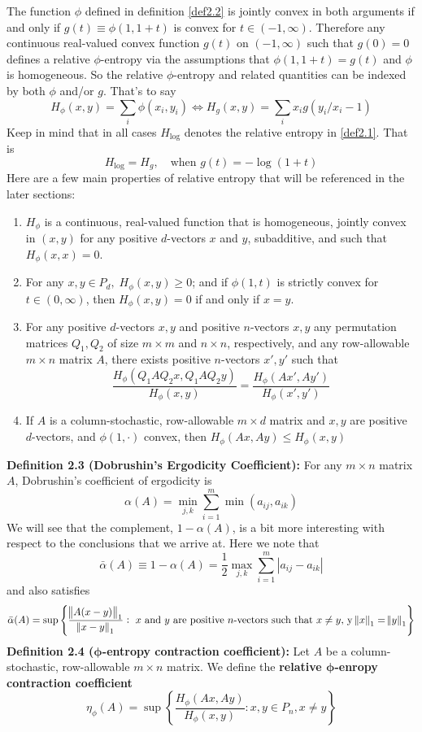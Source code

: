 The function $\phi$ defined in definition \ref{def2.2} is jointly convex in both arguments if and only if $g(t)\equiv \phi(1,1+t)$ is convex for $t \in (-1, \infty)$. Therefore any continuous real-valued convex function $g(t)$ on $(-1, \infty)$ such that $g(0)=0$ defines a relative $\phi$-entropy via the assumptions that $\phi(1,1+t) = g(t)$ and $\phi$ is homogeneous. So the relative $\phi$-entropy and related quantities can be indexed by both $\phi$ and/or $g$. That's to say \[H_\phi(x,y)=\sum_i\phi(x_i,y_i) \iff H_g(x,y) = \sum_i x_ig(y_i/x_i - 1)\]  
Keep in mind that in all cases $H_{\log}$ denotes the relative entropy in \ref{def2.1}. That is \[H_{\log} = H_g, \quad \text{when } g(t) = -\log(1+t)\] 
Here are a few main properties of relative entropy that will be referenced in the later sections:
\begin{enumerate}
    \itemsep0em
    \item \label{prop1} $H_\phi$ is a continuous, real-valued function that is homogeneous, jointly convex in $(x,y)$ for any positive $d$-vectors $x$ and $y$, subadditive, and such that $H_\phi(x,x) = 0$.
    \item \label{prop2} For any $x,y \in P_d, \; H_\phi(x,y) \geq 0$; and if $\phi(1,t)$ is strictly convex for $t \in (0, \infty)$, then $H_\phi(x,y) = 0$ if and only if $x = y$.
    \item \label{prop3} For any positive $d$-vectors $x,y$ and positive $n$-vectors $x,y$ any permutation matrices $Q_1, Q_2$ of size $m \times m$ and $n \times n$, respectively, and any row-allowable $m\times n$ matrix $A$, there exists positive $n$-vectors $x', y'$ such that \[\frac{H_\phi(Q_1 A Q_2 x, Q_1 A Q_2 y)}{H_\phi(x,y)} = \frac{H_\phi(Ax', Ay')}{H_\phi(x',y')}\]
    \item  \label{prop4}If $A$ is a column-stochastic, row-allowable $m \times d$ matrix and $x,y$ are positive $d$-vectors, and $\phi(1, \cdot)$ convex, then $H_\phi(Ax, Ay) \leq H_\phi (x,y)$
\end{enumerate}
\noindent\textbf{Definition 2.3 (Dobrushin's Ergodicity Coefficient):} For any $m \times n$ matrix $A$, Dobrushin's coefficient of ergodicity is
\[\alpha(A) = \min_{j, k}\sum_{i = 1}^m \min(a_{ij},a_{ik})\] 
We will see that the complement, $1- \alpha(A)$, is a bit more interesting with respect to the conclusions that we arrive at. Here we note that 
\[\bar{\alpha}(A) \equiv 1 - \alpha(A) = \frac{1}{2} \max_{j,k}\sum_{i = 1}^m|a_{ij} - a_{ik}|\]
and also satisfies
\[\bar{\alpha}(A) = \sup \left\{\frac{\norm{A(x-y)}_1}{\norm{x-y}_1}: \text{ $x$ and $y$ are positive $n$-vectors such that } x\neq y, \, \text{y} \, \norm{x}_1 = \norm{y}_1\right\}\]
\textbf{Definition 2.4 ($\bm{\phi}$-entropy contraction coefficient):} Let $A$ be a column-stochastic, row-allowable $m \times n$ matrix. We define the \textbf{relative $\bm{\phi}$-enropy contraction coefficient} \[\eta_\phi (A) = \sup \left\{\frac{H_\phi(Ax, Ay)}{H_\phi(x,y)}: x,y \in P_n, x \neq y\right\}\]





